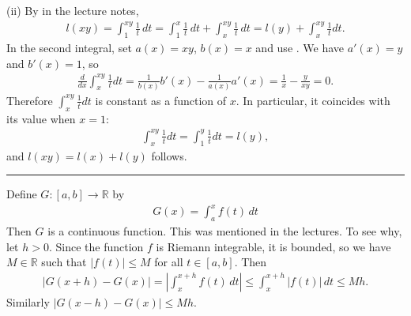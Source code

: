 \documentclass[letterpaper,10pt,english]{jupyterBook}
\begin{document}
\sphinxAtStartPar
(ii) By  in the lecture notes,
\begin{equation*}
\begin{split}
l(xy) =\int_1^{xy}\frac{1}{t}\, dt= \int_1^x \frac{1}{t}\, dt + \int_x^{xy} \frac{1}{t}\, dt = l(y) + \int_x^{xy}\frac{1}{t}dt.
\end{split}
\end{equation*}
\sphinxAtStartPar
In the second integral, set \(a(x)=xy\), \(b(x)=x\) and use {\hyperref[\detokenize{Problems:id72}]{}}. We have \(a'(x)=y\) and \(b'(x)=1\), so
\begin{equation*}
\begin{split}
\frac{d}{dx}\int_x^{xy} \frac{1}{t}dt = \frac{1}{b(x)}b'(x) - \frac{1}{a(x)}a'(x) = \frac{1}{x} - \frac{y}{xy} =0.
\end{split}
\end{equation*}
\sphinxAtStartPar
Therefore \(\int_x^{xy}\frac{1}{t}dt\) is constant as a function of \(x\). In particular, it coincides with its value when \(x=1\):
\begin{equation*}
\begin{split}
\int_x^{xy}\frac{1}{t}dt = \int_1^{y}\frac{1}{t}dt = l(y),
\end{split}
\end{equation*}
\sphinxAtStartPar
and \(l(xy)=l(x)+l(y)\) follows.


\bigskip\hrule\bigskip


\sphinxAtStartPar
{\hyperref[\detokenize{Problems:id75}]{}} Define \(G\colon [a,b]\rightarrow \mathbb{R}\) by
\begin{equation*}
\begin{split}
G(x) = \int_a^x f(t)\, dt
\end{split}
\end{equation*}
\sphinxAtStartPar
Then \(G\) is a continuous function. This was mentioned in the lectures. To see why, let \(h>0\). Since the function \(f\) is Riemann integrable, it is bounded, so we have \(M\in \mathbb{R}\) such that \(|f(t)|\leq M\) for all \(t\in [a,b]\). Then
\begin{equation*}
\begin{split}
|G(x+h) - G(x) | =\left| \int_x^{x+h} f(t)\, dt \right| \leq \int_x^{x+h} |f(t)|\, dt \leq Mh.
\end{split}
\end{equation*}
\sphinxAtStartPar
Similarly \(|G(x-h) - G(x) | \leq Mh\).
\end{document}

